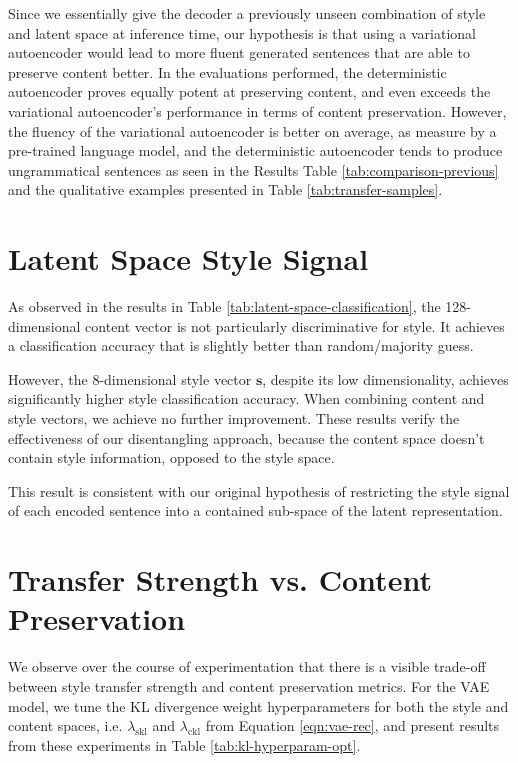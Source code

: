 Since we essentially give the decoder a previously unseen combination of style and latent space at inference time, our hypothesis is that using a variational autoencoder would lead to more fluent generated sentences that are able to preserve content better. In the evaluations performed, the deterministic autoencoder proves equally potent at preserving content, and even exceeds the variational autoencoder's performance in terms of content preservation. However, the fluency of the variational autoencoder is better on average, as measure by a pre-trained language model, and the deterministic autoencoder tends to produce ungrammatical sentences as seen in the Results Table \ref{tab:comparison-previous} and the qualitative examples presented in Table \ref{tab:transfer-samples}.


\section{Latent Space Style Signal}

As observed in the results in Table \ref{tab:latent-space-classification}, the 128-dimensional content vector is not particularly discriminative for style. It achieves a classification accuracy that is slightly better than random/majority guess.

However, the 8-dimensional style vector $\bm s$, despite its low dimensionality, achieves significantly higher style classification accuracy. When combining content and style vectors, we achieve no further improvement. These results verify the effectiveness of our disentangling approach, because the content space doesn't contain style information, opposed to the style space.

This result is consistent with our original hypothesis of restricting the style signal of each encoded sentence into a contained sub-space of the latent representation.


\section{Transfer Strength vs. Content Preservation}

We observe over the course of experimentation that there is a visible trade-off between style transfer strength and content preservation metrics. For the VAE model, we tune the KL divergence weight hyperparameters for both the style and content spaces, i.e. $\lambda_{\text{skl}}$ and $\lambda_{\text{ckl}}$ from Equation \ref{eqn:vae-rec}, and present results from these experiments in Table \ref{tab:kl-hyperparam-opt}.

